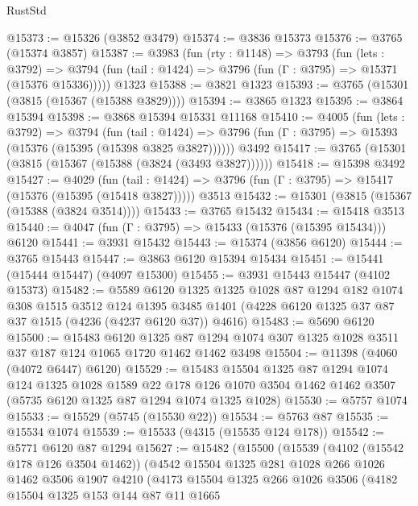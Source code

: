 \begin{lexlean}{RustStd}
\begin{coremodule}
@15373 := @15326 (@3852 @3479)
@15374 := @3836 @15373
@15376 := @3765 (@15374 @3857)
@15387 := @3983
    (fun (rty : @1148) =>
    @3793
      (fun (lets : @3792) =>
      @3794 (fun (tail : @1424) => @3796 (fun (Γ : @3795) => @15371 (@15376 @15336)))))
    @1323
@15388 := @3821 @1323
@15393 := @3765 (@15301 (@3815 (@15367 (@15388 @3829))))
@15394 := @3865 @1323
@15395 := @3864 @15394
@15398 := @3868 @15394 @15331 @11168
@15410 := @4005
    (fun (lets : @3792) =>
    @3794
      (fun (tail : @1424) =>
      @3796 (fun (Γ : @3795) => @15393 (@15376 (@15395 (@15398 @3825 @3827))))))
    @3492
@15417 := @3765 (@15301 (@3815 (@15367 (@15388 (@3824 (@3493 @3827))))))
@15418 := @15398 @3492
@15427 := @4029
    (fun (tail : @1424) => @3796 (fun (Γ : @3795) => @15417 (@15376 (@15395 (@15418 @3827)))))
    @3513
@15432 := @15301 (@3815 (@15367 (@15388 (@3824 @3514))))
@15433 := @3765 @15432
@15434 := @15418 @3513
@15440 := @4047 (fun (Γ : @3795) => @15433 (@15376 (@15395 @15434))) @6120
@15441 := @3931 @15432
@15443 := @15374 (@3856 @6120)
@15444 := @3765 @15443
@15447 := @3863 @6120 @15394 @15434
@15451 := @15441 (@15444 @15447) (@4097 @15300)
@15455 := @3931 @15443 @15447 (@4102 @15373)
@15482 := @5589
    @6120
    @1325
    @1325
    @1028
    @87
    @1294
    @182
    @1074
    @308
    @1515
    @3512
    @124
    @1395
    @3485
    @1401
    (@4228 @6120 @1325 @37 @87 @37 @1515 (@4236 (@4237 @6120 @37)) @4616)
@15483 := @5690 @6120
@15500 := @15483
    @6120
    @1325
    @87
    @1294
    @1074
    @307
    @1325
    @1028
    @3511
    @37
    @187
    @124
    @1065
    @1720
    @1462
    @1462
    @3498
@15504 := @11398 (@4060 (@4072 @6447) @6120)
@15529 := @15483
    @15504
    @1325
    @87
    @1294
    @1074
    @124
    @1325
    @1028
    @1589
    @22
    @178
    @126
    @1070
    @3504
    @1462
    @1462
    @3507
    (@5735 @6120 @1325 @87 @1294 @1074 @1325 @1028)
@15530 := @5757 @1074
@15533 := @15529 (@5745 (@15530 @22))
@15534 := @5763 @87
@15535 := @15534 @1074
@15539 := @15533 (@4315 (@15535 @124 @178))
@15542 := @5771 @6120 @87 @1294
@15627 := @15482
    (@15500
      (@15539
        (@4102 (@15542 @178 @126 @3504 @1462))
        (@4542
          @15504
          @1325
          @281
          @1028
          @266
          @1026
          @1462
          @3506
          @1907
          @4210
          (@4173
            @15504
            @1325
            @266
            @1026
            @3506
            (@4182
              @15504
              @1325
              @153
              @144
              @87
              @11
              @1665

\end{coremodule}
\end{lexlean}
